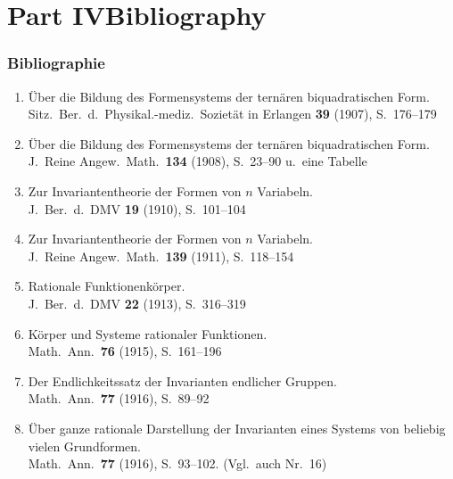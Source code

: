 \documentclass[12pt,a4paper]{article}
\theoremstyle{plain}
\theoremstyle{definition}
\theoremstyle{remark}
\begin{document}
\part*{Part IV\hspace{1em}Bibliography}

\section*{Bibliographie}

\begin{enumerate}[label={\small\arabic*.},leftmargin=2em,itemsep=0.3em]
\item \"Uber die Bildung des Formensystems der tern\"aren biquadratischen Form.\\
Sitz.\ Ber.\ d.\ Physikal.-mediz.\ Soziet\"at in Erlangen \textbf{39} (1907), S.~176--179

\item \"Uber die Bildung des Formensystems der tern\"aren biquadratischen Form.\\
J.\ Reine Angew.\ Math.\ \textbf{134} (1908), S.~23--90 u.\ eine Tabelle

\item Zur Invariantentheorie der Formen von $n$ Variabeln.\\
J.\ Ber.\ d.\ DMV \textbf{19} (1910), S.~101--104

\item Zur Invariantentheorie der Formen von $n$ Variabeln.\\
J.\ Reine Angew.\ Math.\ \textbf{139} (1911), S.~118--154

\item Rationale Funktionenk\"orper.\\
J.\ Ber.\ d.\ DMV \textbf{22} (1913), S.~316--319

\item K\"orper und Systeme rationaler Funktionen.\\
Math.\ Ann.\ \textbf{76} (1915), S.~161--196

\item Der Endlichkeitssatz der Invarianten endlicher Gruppen.\\
Math.\ Ann.\ \textbf{77} (1916), S.~89--92

\item \"Uber ganze rationale Darstellung der Invarianten eines Systems von
beliebig vielen Grundformen.\\
Math.\ Ann.\ \textbf{77} (1916), S.~93--102. (Vgl.\ auch Nr.~16)


\end{enumerate}
\end{document}
